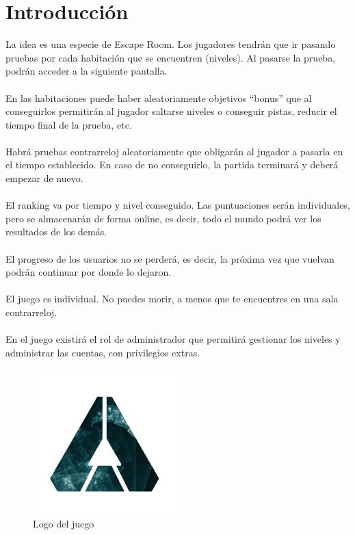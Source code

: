 \section{Introducción}\label{sec:intro}


La idea es una especie de Escape Room. Los jugadores tendrán que ir pasando pruebas por cada habitación que se encuentren (niveles). Al pasarse la prueba, podrán acceder a la siguiente pantalla.
\\
\\En las habitaciones puede haber aleatoriamente objetivos “bonus” que al conseguirlos permitirán al jugador saltarse niveles o conseguir pistas, reducir el tiempo final de la prueba, etc.
\\
\\Habrá pruebas contrarreloj aleatoriamente que obligarán al jugador a pasarla en el tiempo establecido. En caso de no conseguirlo, la partida terminará y deberá empezar de nuevo.
\\
\\El ranking va por tiempo y nivel conseguido. Las puntuaciones serán individuales, pero se almacenarán de forma online, es decir, todo el mundo podrá ver los resultados de los demás. 
\\
\\El progreso de los usuarios no se perderá, es decir, la próxima vez que vuelvan podrán continuar por donde lo dejaron.
\\
\\El juego es individual. No puedes morir, a menos que te encuentres en una sala contrarreloj. 
\\
\\En el juego existirá el rol de administrador que permitirá gestionar los niveles y administrar las cuentas, con privilegios extras.

\begin{figure}[ht]
  \centering
  \includegraphics[width=0.5\textwidth]{./imatges/logo.png}
  \caption{Logo del juego}
  \label{fig:gamelogo}
\end{figure}
